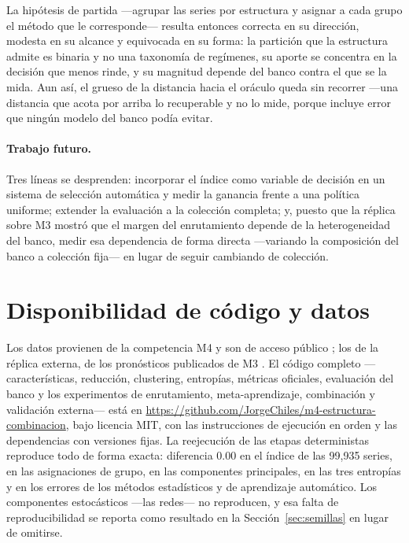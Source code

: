 La hipótesis de partida ---agrupar las series por estructura y asignar a cada grupo el
método que le corresponde--- resulta entonces correcta en su dirección, modesta en su
alcance y equivocada en su forma: la partición que la estructura admite es binaria y no
una taxonomía de regímenes, su aporte se concentra en la decisión que menos rinde, y su
magnitud depende del banco contra el que se la mida. Aun así, el grueso de la distancia
hacia el oráculo queda sin recorrer ---una distancia que acota por arriba lo recuperable y
no lo mide, porque incluye error que ningún modelo del banco podía evitar.

\paragraph{Trabajo futuro.} Tres líneas se desprenden: incorporar el índice como
variable de decisión en un sistema de selección automática y medir la ganancia frente a
una política uniforme; extender la evaluación a la colección completa; y, puesto que la
réplica sobre M3 mostró que el margen del enrutamiento depende de la heterogeneidad del
banco, medir esa dependencia de forma directa ---variando la composición del banco a
colección fija--- en lugar de seguir cambiando de colección.


\section*{Disponibilidad de código y datos}

Los datos provienen de la competencia M4 y son de acceso público \cite{m4results}; los de
la réplica externa, de los pronósticos publicados de M3 \cite{mcomp}. El código completo
---características, reducción, clustering, entropías, métricas oficiales, evaluación del
banco y los experimentos de enrutamiento, meta-aprendizaje, combinación y validación
externa--- está en \url{https://github.com/JorgeChiles/m4-estructura-combinacion}, bajo
licencia MIT, con las instrucciones de ejecución en orden y las dependencias con versiones
fijas. La reejecución de las etapas deterministas reproduce todo de forma exacta:
diferencia $0.00$ en el índice de las 99{,}935 series, en las asignaciones de grupo, en las
componentes principales, en las tres entropías y en los errores de los métodos
estadísticos y de aprendizaje automático. Los componentes estocásticos ---las redes--- no
reproducen, y esa falta de reproducibilidad se reporta como resultado en la
Sección~\ref{sec:semillas} en lugar de omitirse.


